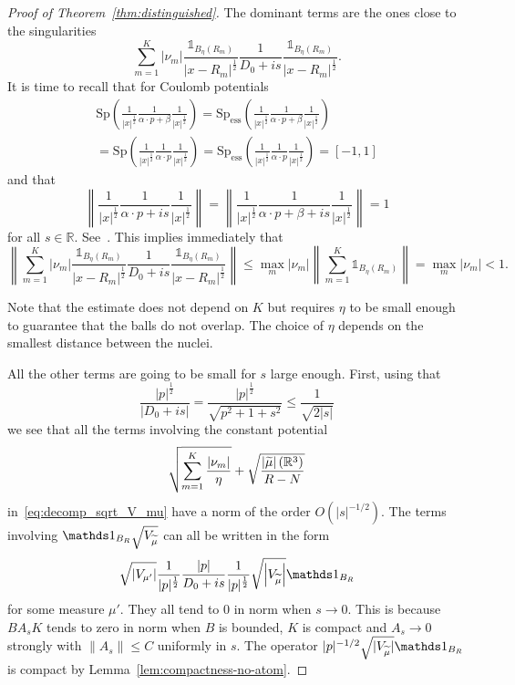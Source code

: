 \documentclass[AHL,Unicode,published]{cedram}
\newcommand{\R}{\mathbb{R}}
\newcommand{\Spec}{\mathrm{Sp}}
\DeclareMathOperator{\ess}{ess}
\newcommand\1{{\ensuremath {\mathds 1} }}
\newcommand{\norm}[1]{ \left\| #1 \right\|}
\renewcommand{\leq}{\leqslant}
\renewcommand{\tilde}{\widetilde}
\let\oldtilde\tilde
\renewcommand*{\tilde}[1]{\mathchoice{\widetilde{#1}}{\widetilde{#1}}{\oldtilde{#1}}{\oldtilde{#1}}}
\begin{document}
\begin{proof}[Proof of Theorem~\ref{thm:distinguished}]
The dominant terms are the ones close to the singularities
\[
\sum_{m=1}^K\left|\nu_m\right|\frac{\1_{B_\eta(R_m)}}{\left|x-R_m\right|^{\frac12}}\frac{1}{D_0+is}\frac{\1_{B_\eta(R_m)}}{\left|x-R_m\right|^{\frac12}}.
\]
It is time to recall that for Coulomb potentials
\begin{multline}\label{eq:rappel_Coulomb}
\Spec\left(\frac{1}{|x|^{\frac12}}\frac{1}{\alpha\cdot p+\beta}\frac{1}{|x|^{\frac12}}\right)=\Spec_{\ess}\left(\frac{1}{|x|^{\frac12}}\frac{1}{\alpha\cdot p+\beta}\frac{1}{|x|^{\frac12}}\right)\\=\Spec\left(\frac{1}{|x|^{\frac12}}\frac{1}{\alpha\cdot p}\frac{1}{|x|^{\frac12}}\right)=\Spec_{\ess}\left(\frac{1}{|x|^{\frac12}}\frac{1}{\alpha\cdot p}\frac{1}{|x|^{\frac12}}\right)=[-1,1]
\end{multline}
and that
\begin{equation}\label{eq:rappel_Coulomb_2}
\norm{\frac{1}{|x|^{\frac12}}\frac{1}{\alpha\cdot p+is}\frac{1}{|x|^{\frac12}}}=\norm{\frac{1}{|x|^{\frac12}}\frac{1}{\alpha\cdot p+\beta+is}\frac{1}{|x|^{\frac12}}}=1
\end{equation}
for all $s\in\R$. See~\cite{ArrDuoVeg-13,Kato-83,Klaus-80b,Nenciu-76,Wust-77}. This implies immediately that
\[
\norm{\sum_{m=1}^K\left|\nu_m\right|\frac{\1_{B_\eta(R_m)}}{\left|x-R_m\right|^{\frac12}}\frac{1}{D_0+is}\frac{\1_{B_\eta(R_m)}}{\left|x-R_m\right|^{\frac12}}}
\leq\max_m\left|\nu_m\right|\norm{\sum_{m=1}^K\1_{B_\eta(R_m)}}=\max_m\left|\nu_m\right|<1.
\]

Note that the estimate does not depend on $K$ but requires $\eta$ to be small enough to guarantee that the balls do not overlap. The choice of $\eta$ depends on the smallest distance between the nuclei.

All the other terms are going to be small for $s$ large enough. First, using that
\[
\frac{|p|^{\frac12}}{\left|D_0+is\right|}=\frac{|p|^{\frac12}}{\sqrt{p^2+1+s^2}}\leq\frac{1}{\sqrt{2|s|}}
\]
we see that all the terms involving the constant potential
\[
\sqrt{\sum_{m=1}^K\frac{\left|\nu_m\right|}{\eta}}+\sqrt{\frac{\left|\tilde\mu\right|\left(\R^3\right)}{R-N}}
\]
in~\eqref{eq:decomp_sqrt_V_mu} have a norm of the order $O(|s|^{-1/2})$. The terms involving $\1_{B_R}\sqrt{V_{\tilde\mu}}$ can all be written in the form
\[
\sqrt{\left|V_{\mu'}\right|}\frac1{|p|^{\frac12}}\frac{|p|}{D_0+is}\frac1{|p|^{\frac12}}\sqrt{\left|V_{\tilde\mu}\right|}\1_{B_R}
\]
for some measure $\mu'$. They all tend to 0 in norm when $s\to0$. This is because $BA_sK$ tends to zero in norm when $B$ is bounded, $K$ is compact and $A_s\to0$ strongly with $\|A_s\|\leq C$ uniformly in $s$. The operator $|p|^{-1/2}\sqrt{|V_{\tilde\mu}|}\1_{B_R}$ is compact by Lemma~\ref{lem:compactness-no-atom}.


\end{proof}
\end{document}
